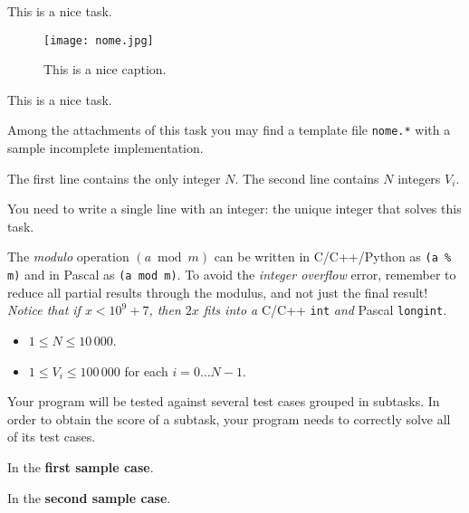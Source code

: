 \usepackage{xcolor}
\usepackage{afterpage}
\usepackage{pifont,mdframed}
\usepackage[bottom]{footmisc}

\makeatletter
\gdef\this@inputfilename{input}
\gdef\this@outputfilename{output}
\makeatother

    This is a nice task.

    \begin{figure}[H]
        \centering
        \texttt{[image: nome.jpg]}
        \caption{This is a nice caption.}
    \end{figure}

    This is a nice task.

\begin{warning}
Among the attachments of this task you may find a template file \texttt{nome.*} with a sample incomplete implementation.
\end{warning}

\InputFile
The first line contains the only integer $N$. The second line contains $N$ integers $V_i$.

\OutputFile
You need to write a single line with an integer: the unique integer that solves this task.

\begin{danger}
The \emph{modulo} operation $(a \bmod m)$ can be written in C/C++/Python as \verb|(a % m)| and in Pascal as \verb|(a mod m)|. To avoid the \emph{integer overflow} error, remember to reduce all partial results through the modulus, and not just the final result! \\
\emph{Notice that if $x < 10^9 + 7$, then $2 x$ fits into a} C/C++ \verb|int| \emph{and} Pascal \verb|longint|.
\end{danger}

\Constraints
\begin{itemize}[nolistsep, itemsep=2mm]
	\item $1 \le N \le 10\,000$.
	\item $1 \le V_i \le 100\,000$ for each $i=0\ldots N-1$.
\end{itemize}

\Scoring
Your program will be tested against several test cases grouped in subtasks.
In order to obtain the score of a subtask, your program needs to correctly solve all of its test cases.







\Examples
\begin{example}
%
%
\end{example}


\Explanation
In the \textbf{first sample case}.

In the \textbf{second sample case}.
